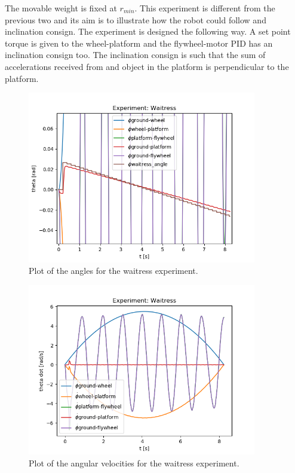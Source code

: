 \begin{enumerate}
	The movable weight is fixed at $r_{min}$. This experiment is different from the previous two and its
	aim is to illustrate
		  how the robot could follow and inclination consign. The experiment is designed
		  the following way. A set point torque is given to the wheel-platform and the
		  flywheel-motor PID has an inclination consign too. The inclination consign is such
		  that the sum of accelerations received from and object in the platform is perpendicular
		  to the platform. 



	      \begin{figure}[H]
		      \centering
		      \includegraphics[width=10cm]{img/lagrange_5/waitress_q_zoom.png}
		      \caption{Plot of the angles for the waitress experiment.}
		      \label{fig:Simulation pendulum q}
	      \end{figure}


	      \begin{figure}[H]
		      \centering
		      \includegraphics[width=10cm]{img/lagrange_5/waitress_q_dot.png}
		      \caption{Plot of the angular velocities for the waitress experiment.}
		      \label{fig:Simulation pendulum q dot}
	      \end{figure}

\end{enumerate}
